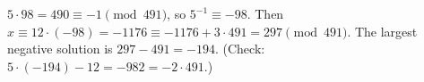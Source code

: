 $5\cdot98=490\equiv-1\pmod{491}$, so $5^{-1}\equiv-98$. Then $x\equiv12\cdot(-98)=-1176\equiv-1176+3\cdot491=297\pmod{491}$. The largest negative solution is $297-491=\boxed{-194}$. (Check: $5\cdot(-194)-12=-982=-2\cdot491$.)
